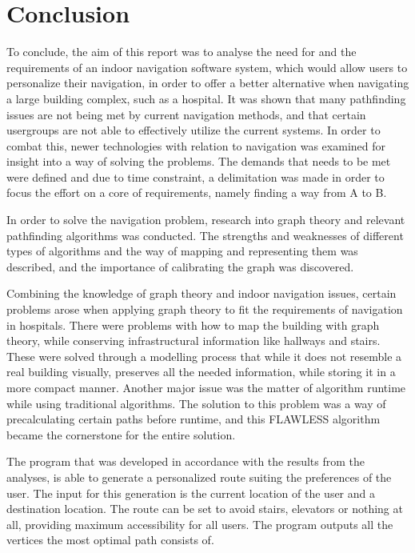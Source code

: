 \chapter{Conclusion}

To conclude, the aim of this report was to analyse the need for and the requirements of an indoor navigation software system, which would allow users to personalize their navigation, in order to offer a better alternative when navigating a large building complex, such as a hospital. It was shown that many pathfinding issues are not being met by current navigation methods, and that certain usergroups are not able to effectively utilize the current systems. In order to combat this, newer technologies with relation to navigation was examined for insight into a way of solving the problems. The demands that needs to be met were defined and due to time constraint, a delimitation was made in order to focus the effort on a core of requirements, namely finding a way from A to B.

In order to solve the navigation problem, research into graph theory and relevant pathfinding algorithms was conducted. The strengths and weaknesses of different types of algorithms and the way of mapping and representing them was described, and the importance of calibrating the graph was discovered. 

Combining the knowledge of graph theory and indoor navigation issues, certain problems arose when applying graph theory to fit the requirements of navigation in hospitals. There were problems with how to map the building with graph theory, while conserving infrastructural information like hallways and stairs. These were solved through a modelling process that while it does not resemble a real building visually, preserves all the needed information, while storing it in a more compact manner. Another major issue was the matter of algorithm runtime while using traditional algorithms. The solution to this problem was a way of precalculating certain paths before runtime, and this FLAWLESS algorithm became the cornerstone for the entire solution.

The program that was developed in accordance with the results from the analyses, is able to generate a personalized route suiting the preferences of the user. The input for this generation is the current location of the user and a destination location. The route can be set to avoid stairs, elevators or nothing at all, providing maximum accessibility for all users. The program outputs all the vertices the most optimal path consists of.